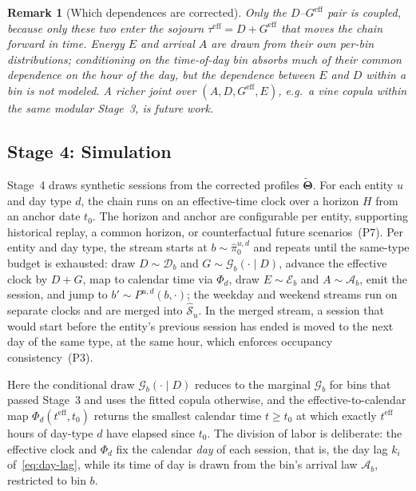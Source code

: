 \documentclass[journal]{IEEEtran}
\newtheorem{remark}{Remark}
\begin{document}
\begin{remark}[Which dependences are corrected]
\label{rem:which-dependence}
Only the $D$--$G^{\mathrm{eff}}$ pair is coupled, because only these two enter the sojourn $\tau^{\mathrm{eff}} = D + G^{\mathrm{eff}}$ that moves the chain forward in time. Energy $E$ and arrival $A$ are drawn from their own per-bin distributions; conditioning on the time-of-day bin absorbs much of their common dependence on the hour of the day, but the dependence between $E$ and $D$ within a bin is not modeled. A richer joint over $(A, D, G^{\mathrm{eff}}, E)$, e.g.\ a vine copula within the same modular Stage~3, is future work.
\end{remark}


\subsection{Stage 4: Simulation}
\label{subsec:stage4}

Stage~4 draws synthetic sessions from the corrected profiles $\tilde{\boldsymbol{\Theta}}$. For each entity $u$ and day type $d$, the chain runs on an effective-time clock over a horizon $H$ from an anchor date $t_0$. The horizon and anchor are configurable per entity, supporting historical replay, a common horizon, or counterfactual future scenarios~(P7). Per entity and day type, the stream starts at $b \sim \hat{\pi}_0^{u,d}$ and repeats until the same-type budget is exhausted: draw $D \sim \mathcal{D}_b$ and $G \sim \mathcal{G}_b(\cdot \mid D)$, advance the effective clock by $D + G$, map to calendar time via $\Phi_d$, draw $E \sim \mathcal{E}_b$ and $A \sim \mathcal{A}_b$, emit the session, and jump to $b' \sim P^{u,d}(b, \cdot)$; the weekday and weekend streams run on separate clocks and are merged into $\hat{\mathcal{S}}_u$. In the merged stream, a session that would start before the entity's previous session has ended is moved to the next day of the same type, at the same hour, which enforces occupancy consistency~(P3).


Here the conditional draw $\mathcal{G}_b(\cdot \mid D)$ reduces to the marginal $\mathcal{G}_b$ for bins that passed Stage~3 and uses the fitted copula otherwise, and the effective-to-calendar map $\Phi_d(t^{\mathrm{eff}}, t_0)$ returns the smallest calendar time $t \geq t_0$ at which exactly $t^{\mathrm{eff}}$ hours of day-type $d$ have elapsed since $t_0$. The division of labor is deliberate: the effective clock and $\Phi_d$ fix the calendar \emph{day} of each session, that is, the day lag $k_i$ of~\eqref{eq:day-lag}, while its time of day is drawn from the bin's arrival law $\mathcal{A}_b$, restricted to bin $b$.
\end{document}
